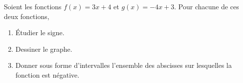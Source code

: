 
\begin{exercice}\label{exosmath-0148}

    Soient les fonctions \( f(x)=3x+4\) et \( g(x)=-4x+3\). Pour chacune de ces deux fonctions,
    \begin{enumerate}
        \item
            Étudier le signe.
        \item
            Dessiner le graphe.
        \item
            Donner sous forme d'intervalles l'ensemble des abscisses sur lesquelles la fonction est négative.
    \end{enumerate}

\end{exercice}

